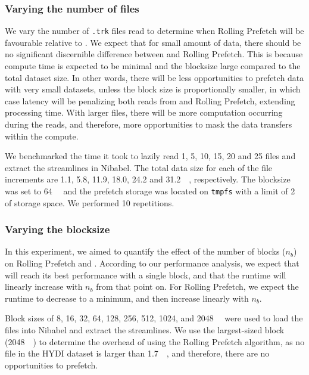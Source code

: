 \subsubsection{Varying the number of files}\label{exp:files}

We vary the number of \texttt{.trk} files read to determine when Rolling
Prefetch will be favourable relative to \sfs. We expect that for small amount of
data, there should be no significant discernible difference between \sfs and
Rolling Prefetch. This is because compute time is expected to be minimal and the
blocksize large compared to the total dataset size. In other words, there will
be less opportunities to prefetch data with very small datasets, unless the
block size is proportionally smaller, in which case latency will be penalizing
both reads from \sfs and Rolling Prefetch, extending processing time. With
larger files, there will be more computation occurring during the reads, and
therefore, more opportunities to mask the data transfers within the compute.

We benchmarked the time it took to lazily read 1, 5, 10, 15, 20 and 25 files and
extract the streamlines in Nibabel. The total data size for each of the file
increments are 1.1, 5.8, 11.9, 18.0, 24.2 and \SI{31.2}{\gibi\byte},
respectively. The blocksize was set to \SI{64}{\mebi\byte} and the prefetch
storage was located on \texttt{tmpfs} with a limit of \SI{2}{\gibi\byte} of
storage space. We performed 10 repetitions.

\subsubsection{Varying the blocksize}\label{exp:blocksize} In this experiment,
we aimed to quantify the effect of the number of blocks ($n_b$) on Rolling
Prefetch and \sfs. According to our performance analysis, we expect that \sfs
will reach its best performance with a single block, and that the runtime will
linearly increase with $n_b$ from that point on. For Rolling Prefetch, we expect
the runtime to decrease to a minimum, and then increase linearly with $n_b$.


Block sizes of 8, 16, 32, 64, 128, 256, 512, 1024, and \SI{2048}{\mebi\byte}
were used to load the files into Nibabel and extract the streamlines.
We use the largest-sized block (\SI{2048}{\mebi\byte}) to determine the overhead
of using the Rolling Prefetch algorithm, as no file in the HYDI dataset is
larger than \SI{1.7}{\gibi\byte}, and therefore, there are no opportunities to
prefetch.

